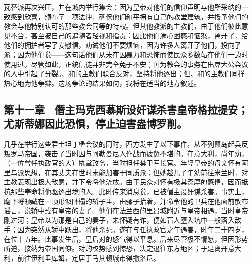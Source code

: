 瓦替派再次兴旺，并在城内举行集会：因为皇帝对他们的信仰声明与他所采纳的一致感到欣喜，颁布了一项法律，确保他们和平拥有自己的教堂建筑，并授予他们的教会与他特别认可的那些教会同等的特权。但其他教派的主教们，由于他们彼此意见不合，甚至被自己的追随者轻视和指责：因此他们满心困惑和恼怒，离开了，给他们的拥护者写了安慰信，劝诫他们不要烦恼，因为许多人离开了他们，投向了派；因为他们说——这句话他们从未在因暴力和恐怖而使民众多数站在他们一边时使用过。尽管如此，正统信徒并非完全免于不安；因为教会的事务在出席大公会议的人中引起了分裂。、和的主教们联合反对，坚持将他逐出；但、和的主教们同样热心地为他争辩。这场争论的结果如何，我将在适当的地方叙述。\par


\subsection{第十一章　僭主玛克西慕斯设奸谋杀害皇帝格拉提安；尤斯蒂娜因此恐惧，停止迫害盎博罗削。}

几乎在举行这些君士坦丁堡会议的同时，西方发生了以下事件。从不列颠岛起兵反叛罗马帝国，袭击了当时因与阿勒曼尼人作战而疲惫不堪的。在意大利，尚年幼，（一位曾任执政官的人）执掌政务，当时担任禁卫军长官。年轻皇帝的母亲怀有阿里乌派思想，在其丈夫在世时未能加害于同质派；但她趁儿子年幼前往米兰时，对主教表现出极大敌意，并下令将他流放。由于民众对怀有极其深厚的感情，因而抵抗那些奉命将他驱逐出境的人。此时传来消息说，已被僭主设奸谋杀害。事实上，麾下将领藏在一顶形似卧榻的轿子里，由骡子抬着，并命令他的卫兵在他面前散布谣言，说轿中载有皇帝的妻子。他们在法兰西的里昂城附近与皇帝相遇，当时皇帝刚过河；皇帝以为那是自己的妻子，未怀疑有诈，便如盲人堕入坑中一般落入敌手；因为突然从轿中跃出，将他杀死。遂在与任执政官之年遇害，时年二十四岁，在位十五年。此事发生后，皇后对的怒气得以平息。后来尽管极不情愿，但因形势所迫，接纳为帝国同僚。对的权势感到惊恐，决定退往东方地区；于是离开意大利，前往伊利里库姆，定居于马其顿城市得撒洛尼。\par

